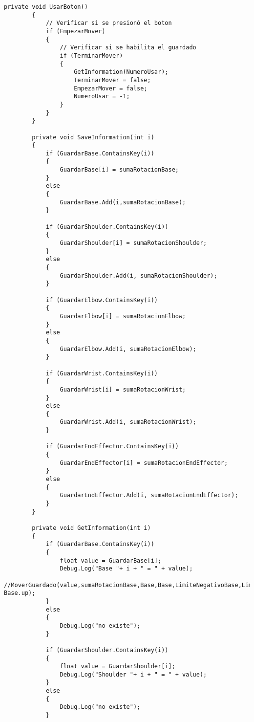\begin{lstlisting}[frame=single]
        private void UsarBoton()
        {
            // Verificar si se presionó el boton
            if (EmpezarMover)
            {
                // Verificar si se habilita el guardado
                if (TerminarMover)
                {
                    GetInformation(NumeroUsar);
                    TerminarMover = false;
                    EmpezarMover = false;
                    NumeroUsar = -1;
                }
            }
        }

        private void SaveInformation(int i)
        {
            if (GuardarBase.ContainsKey(i))
            {
                GuardarBase[i] = sumaRotacionBase;
            }
            else
            {
                GuardarBase.Add(i,sumaRotacionBase);
            }

            if (GuardarShoulder.ContainsKey(i))
            {
                GuardarShoulder[i] = sumaRotacionShoulder;
            }
            else
            {
                GuardarShoulder.Add(i, sumaRotacionShoulder);
            }

            if (GuardarElbow.ContainsKey(i))
            {
                GuardarElbow[i] = sumaRotacionElbow;
            }
            else
            {
                GuardarElbow.Add(i, sumaRotacionElbow);
            }

            if (GuardarWrist.ContainsKey(i))
            {
                GuardarWrist[i] = sumaRotacionWrist;
            }
            else
            {
                GuardarWrist.Add(i, sumaRotacionWrist);
            }

            if (GuardarEndEffector.ContainsKey(i))
            {
                GuardarEndEffector[i] = sumaRotacionEndEffector;
            }
            else
            {
                GuardarEndEffector.Add(i, sumaRotacionEndEffector);
            }
        }

        private void GetInformation(int i)
        {
            if (GuardarBase.ContainsKey(i))
            {
                float value = GuardarBase[i];
                Debug.Log("Base "+ i + " = " + value);
                //MoverGuardado(value,sumaRotacionBase,Base,Base,LimiteNegativoBase,LimitePositivoBase,velocidadRotacionBase,-Base.up);
            }
            else
            {
                Debug.Log("no existe");
            }

            if (GuardarShoulder.ContainsKey(i))
            {
                float value = GuardarShoulder[i];
                Debug.Log("Shoulder "+ i + " = " + value);
            }
            else
            {
                Debug.Log("no existe");
            }


\end{lstlisting}
